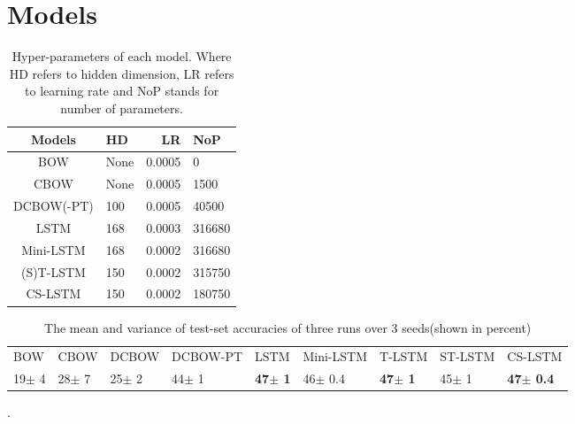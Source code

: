 \section{Models}
\label{sec: models}

\begin{table}[t!]
    \begin{center}
    \begin{tabular}{|c|l|r|l|}
        \hline \bf Models & \bf HD & \bf LR &\bf NoP \\ \hline
        BOW & None & 0.0005 &0\\
        CBOW & None & 0.0005 & 1500\\
        DCBOW(-PT)& 100 & 0.0005 &40500\\
        LSTM&168 & 0.0003 &316680\\
        Mini-LSTM&168 & 0.0002&316680\\
        (S)T-LSTM&150 & 0.0002&315750\\
        CS-LSTM&150 & 0.0002& 180750\\
        \hline
    \end{tabular}
    \end{center}
    \label{tab:parameters}
    \caption{Hyper-parameters of each model. Where HD refers to hidden dimension, LR refers to learning rate and NoP stands for number of parameters.}
\end{table}

\begin{table*}[t]
    \centering
    \small
    \begin{tabular}{lllllllll}
    BOW  & CBOW & DCBOW & DCBOW-PT & LSTM & Mini-LSTM & T-LSTM & ST-LSTM &CS-LSTM \\
    19$\pm$ 4 & 28$\pm$ 7 & 25$\pm$ 2 & 44$\pm$ 1 & \textbf{47$\pm$ 1} & 46$\pm$ 0.4 & \textbf{47$\pm$ 1} & 45$\pm$ 1& \textbf{47$\pm$ 0.4}
    \end{tabular}
    \label{table: results-acc}
    \caption{The mean and variance of test-set accuracies of three runs over 3 seeds(shown in percent)}.
\end{table*}



